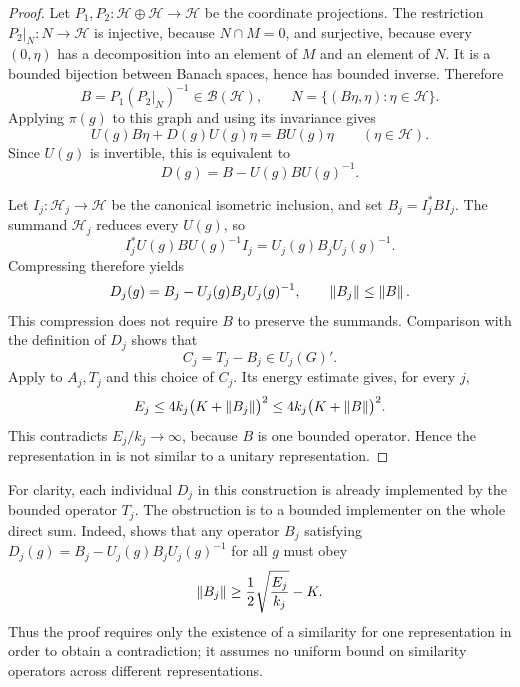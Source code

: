 \begin{proof}
Let $P_1,P_2:\mathcal H\oplus\mathcal H\to\mathcal H$ be the
coordinate projections.
The restriction $P_2|_N:N\to\mathcal H$ is injective, because
$N\cap M=0$, and surjective, because every $(0,\eta)$ has a
decomposition into an element of $M$ and an element of $N$.
It is a bounded bijection between Banach spaces, hence has bounded
inverse.  Therefore
\[
  B=P_1(P_2|_N)^{-1}\in\mathcal B(\mathcal H),
  \qquad
  N=\{(B\eta,\eta):\eta\in\mathcal H\}.
\]
Applying $\pi(g)$ to this graph and using its invariance gives
\[
  U(g)B\eta+D(g)U(g)\eta=BU(g)\eta
  \qquad(\eta\in\mathcal H).
\]
Since $U(g)$ is invertible, this is equivalent to
\begin{equation}
\label{eq:global-cocycle-implementer}
  D(g)=B-U(g)BU(g)^{-1}.
\end{equation}

Let $I_j:\mathcal H_j\to\mathcal H$ be the canonical isometric
inclusion, and set $B_j=I_j^*BI_j$.
The summand $\mathcal H_j$ reduces every $U(g)$, so
\[
  I_j^*U(g)BU(g)^{-1}I_j
  =U_j(g)B_jU_j(g)^{-1}.
\]
Compressing  therefore yields
\[
  D_j(g)=B_j-U_j(g)B_jU_j(g)^{-1},
  \qquad\left\lVert B_j\right\rVert\le\left\lVert B\right\rVert.
\]
This compression does not require $B$ to preserve the summands.
Comparison with the definition of $D_j$ shows that
\[
  C_j=T_j-B_j\in U_j(G)'.
\]
Apply  to $A_j,T_j$ and this choice of
$C_j$.  Its energy estimate gives, for every $j$,
\[
  E_j\le4k_j\bigl(K+\left\lVert B_j\right\rVert\bigr)^2
      \le4k_j\bigl(K+\left\lVert B\right\rVert\bigr)^2.
\]
This contradicts $E_j/k_j\to\infty$, because $B$ is one bounded
operator.  Hence the representation in
 is not similar to a unitary
representation.
\end{proof}

For clarity, each individual $D_j$ in this construction is already
implemented by the bounded operator $T_j$.
The obstruction is to a bounded implementer on the whole direct
sum.  Indeed,  shows that any operator
$B_j$ satisfying
$D_j(g)=B_j-U_j(g)B_jU_j(g)^{-1}$ for all $g$ must obey
\[
  \left\lVert B_j\right\rVert\ge\frac12\sqrt{\frac{E_j}{k_j}}-K.
\]
Thus the proof requires only the existence of a similarity for one
representation in order to obtain a contradiction; it assumes no
uniform bound on similarity operators across different
representations.
